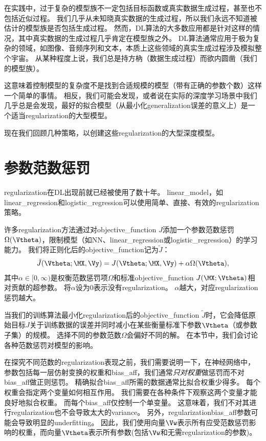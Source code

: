 在实践中，过于复杂的模型族不一定包括目标函数或真实数据生成过程，甚至也不包括近似过程。
我们几乎从未知晓真实数据的生成过程，所以我们永远不知道被估计的模型族是否包括生成过程。
然而，\gls{DL}算法的大多数应用都是针对这样的情况，其中真实数据的生成过程几乎肯定在模型族之外。
\gls{DL}算法通常应用于极为复杂的领域，如图像、音频序列和文本，本质上这些领域的真实生成过程涉及模拟整个宇宙。
从某种程度上说，我们总是持方枘（数据生成过程）而欲内圆凿（我们的模型族）。

这意味着控制模型的复杂度不是找到合适规模的模型（带有正确的参数个数）这样一个简单的事情。
相反，我们可能会发现，或者说在实际的深度学习场景中我们几乎总是会发现，最好的拟合模型（从最小化\gls{generalization}误差的意义上）是一个适当\gls{regularization}的大型模型。

现在我们回顾几种策略，以创建这些\gls{regularization}的大型深度模型。


\section{参数范数惩罚}
\label{sec:parameter_norm_penalties}
\gls{regularization}在\gls{DL}出现前就已经被使用了数十年。
\gls{linear_model}，如\gls{linear_regression}和\gls{logistic_regression}可以使用简单、直接、有效的\gls{regularization}策略。

许多\gls{regularization}方法通过对\gls{objective_function} $J$添加一个参数范数惩罚$\Omega(\Vtheta)$，限制模型（如\gls{NN}、\gls{linear_regression}或\gls{logistic_regression}）的学习能力。
我们将正则化后的\gls{objective_function}记为$\tilde{J}$：
\begin{align}
 \tilde{J}(\Vtheta;\MX, \Vy) = J(\Vtheta;\MX, \Vy) + \alpha \Omega(\Vtheta),
\end{align}
其中$\alpha \in [0, \infty)$是权衡范数惩罚项$\Omega$和标准\gls{objective_function} $J(\MX;\Vtheta)$相对贡献的超参数。
将$\alpha$设为0表示没有\gls{regularization}。
$\alpha$越大，对应\gls{regularization}惩罚越大。

当我们的训练算法最小化\gls{regularization}后的\gls{objective_function} $\tilde{J}$时，它会降低原始目标$J$关于训练数据的误差并同时减小在某些衡量标准下参数$\Vtheta$（或参数子集）的规模。
选择不同的参数范数$\Omega$会偏好不同的解。
在本节中，我们会讨论各种范数惩罚对模型的影响。

在探究不同范数的\gls{regularization}表现之前，我们需要说明一下，在神经网络中，参数包括每一层仿射变换的权重和\gls{bias_aff}，我们通常\emph{只对权重}做惩罚而不对\gls{bias_aff}做正则惩罚。
精确拟合\gls{bias_aff}所需的数据通常比拟合权重少得多。
每个权重会指定两个变量如何相互作用。
我们需要在各种条件下观察这两个变量才能良好地拟合权重。
而每个\gls{bias_aff}仅控制一个单变量。
这意味着，我们不对其进行\gls{regularization}也不会导致太大的\gls{variance}。
另外，\gls{regularization}\gls{bias_aff}参数可能会导致明显的\gls{underfitting}。
因此，我们使用向量$\Vw$表示所有应受范数惩罚影响的权重，而向量$\Vtheta$表示所有参数(包括$\Vw$和无需\gls{regularization}的参数)。

